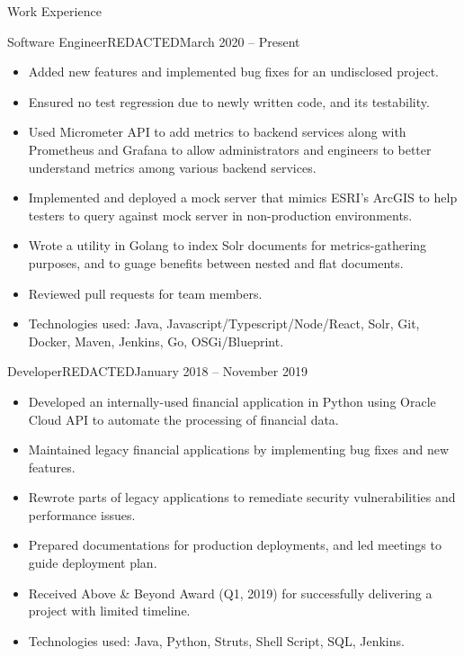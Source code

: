\documentclass[]{mcdowellcv}
\begin{document}
	\begin{cvsection}{Work Experience}
		\begin{cvsubsection}{Software Engineer}{REDACTED}{March 2020 -- Present}
			\begin{itemize}
        \item Added new features and implemented bug fixes for an undisclosed project.
        \item Ensured no test regression due to newly written code, and its testability.
				\item Used Micrometer API to add metrics to backend services along with
          Prometheus and Grafana to allow administrators and engineers to better
          understand metrics among various backend services.
				\item Implemented and deployed a mock server that mimics ESRI's ArcGIS to help
          testers to query against mock server in non-production environments.
				\item Wrote a utility in Golang to index Solr documents for metrics-gathering purposes, and to guage benefits between nested and flat documents.
        \item Reviewed pull requests for team members.
        \item Technologies used: Java, Javascript/Typescript/Node/React, Solr,
          Git, Docker, Maven, Jenkins, Go, OSGi/Blueprint.
			\end{itemize}
		\end{cvsubsection}
		
		\begin{cvsubsection}{Developer}{REDACTED}{January 2018 -- November 2019}	
			\begin{itemize}
				\item Developed an internally-used financial application in Python using
          Oracle Cloud API to automate the processing of financial data.
				\item Maintained legacy financial applications by implementing bug fixes and new features.
        \item Rewrote parts of legacy applications to remediate security vulnerabilities and performance issues.
        \item Prepared documentations for production deployments, and led meetings to guide deployment plan.
        \item Received Above \& Beyond Award (Q1, 2019) for successfully delivering a project with limited timeline.
        \item Technologies used: Java, Python, Struts, Shell Script, SQL, Jenkins.
			\end{itemize}
		\end{cvsubsection}
	\end{cvsection}
	
\end{document}
